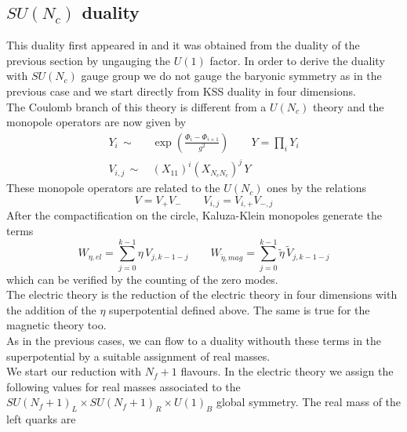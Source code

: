 \subsection{ \boldmath $SU(N_c)$ duality }
\label{sec:reduction_kss_sun}
This duality first appeared in \cite{Park:2013wta} and it was obtained from the duality of the previous section by ungauging the $U(1)$ factor.
In order to derive the duality with $SU(N_c)$ gauge group we do not gauge the baryonic symmetry as in the previous case and we start directly from KSS duality in four dimensions.
\\
The Coulomb branch of this theory is different from a $U(N_c)$ theory and the monopole operators are now given by \cite{Nii:2014jsa}
\begin{align}
Y_i \, \sim \, & \exp \left(   \frac{ \Phi_i - \Phi_{i+1}}{g^2}  \right) \qquad 
Y = \prod_i Y_i
\\
V_{i,j} \, \sim \, & (X_{11})^i (X_{N_c N_c})^j\, Y
\end{align}
These monopole operators are related to the $U(N_c)$ ones by the relations
\begin{equation}
 V = V_+ V_- \qquad V_{i,j} = V_{i,+} V_{-,j}
 \end{equation} 
After the compactification on the circle, Kaluza-Klein monopoles generate the terms \cite{Nii:2014jsa}
\begin{equation}
W_{\eta, el} = \sum_{j=0}^{k-1} \eta \, V_{j,k-1-j} \qquad W_{\tilde{\eta}, mag} = \sum_{j=0}^{k-1 } \tilde{\eta} \, \tilde{V}_{j,k-1-j} 
\end{equation}  
which can be verified by the counting of the zero modes.\\
The electric theory is the reduction of the electric theory in four dimensions with the addition of the $\eta$ superpotential defined above.
The same is true for the magnetic theory too.\\
As in the previous cases, we can flow to a duality withouth these terms in the superpotential by a suitable assignment of real masses.\\ 
We start our reduction with $N_f+1$ flavours.
In the electric theory we assign the following values for real masses associated to the $SU(N_f+1)_L \times SU(N_f+1)_R \times U(1)_B$ global symmetry. 
The real mass of the left quarks are
